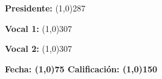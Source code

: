 \vspace{2.0cm}
\textbf{\Large Presidente:}{\Large{} \line(1,0){287}  }{\Large \par} %

\vspace{2.0cm}
\textbf{\Large Vocal 1:}{\Large{} \line(1,0){307}  }{\Large \par} %

\vspace{2.0cm}
\textbf{\Large Vocal 2:}{\Large{} \line(1,0){307}  }{\Large \par} %

\vspace{0.8cm}
\textbf{ Fecha: \line(1,0){75} \hspace{1cm}Calificación: \line(1,0){150}  }{ \par}



